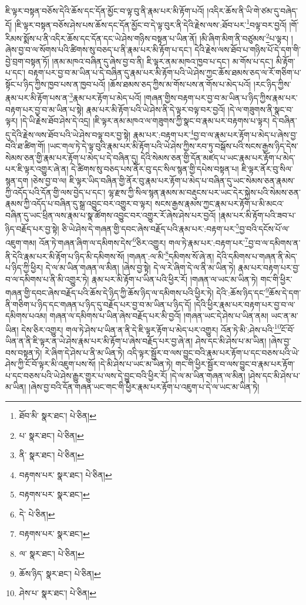 ཇི་ལྟར་བསྟན་བཅོས་དེའི་ཆོས་དང་དོན་མྱོང་བ་ལྟ་བུ་ནི་རྣམ་པར་མི་རྟོག་པའོ། །འདིར་ཆོས་ནི་ཡི་གེ་ཙམ་དུ་བཞེད་དོ། །ཇི་ལྟར་བསྟན་བཅོས་ཤེས་པས་ཆོས་དང་དོན་མྱོང་བ་དེ་ལྟ་བུར་ནི་དེའི་རྗེས་ལས་:ཐོབ་པར་\footnote{ཐོབ་མི་  སྣར་ཐང་།  པེ་ཅིན། }བལྟ་བར་བྱའོ། །གོ་རིམས་སྨོས་པ་ནི་འདིར་ཆོས་དང་དོན་དང་ཡེ་ཤེས་གཉིས་བསྟན་པ་ཡིན་ནོ། །མི་ཞིག་མིག་ནི་བཙུམས་\footnote{པ་  སྣར་ཐང་།  པེ་ཅིན། }པ་ལྟར། །ཞེས་བྱ་བ་ལ་སོགས་པའི་ཚིགས་སུ་བཅད་པ་ནི་རྣམ་པར་མི་རྟོག་པ་དང་། དེའི་རྗེས་ལས་ཐོབ་པ་གཉིས་པོ་དེ་དག་གི་བྱེ་བྲག་བསྟན་ཏོ། །ནམ་མཁའ་བཞིན་དུ་ཞེས་བྱ་བ་ནི། ཇི་ལྟར་ནམ་མཁའ་ཁྱབ་པ་དང་། མ་གོས་པ་དང་། མི་རྟོག་པ་དང་། བརྟག་པར་བྱ་བ་མ་ཡིན་པ་དེ་བཞིན་དུ་རྣམ་པར་མི་རྟོག་པའི་ཡེ་ཤེས་ཀྱང་ཆོས་ཐམས་ཅད་ལ་རོ་གཅིག་པ་སྟོང་པ་ཉིད་ཀྱིས་ཁྱབ་པས་ན་ཁྱབ་པའོ། །ཆོས་ཐམས་ཅད་ཀྱིས་མ་གོས་པས་ན་གོས་པ་མེད་པའོ། །རང་ཉིད་ཀྱིས་རྣམ་པར་མི་རྟོག་པས་ན་\footnote{ནི་  སྣར་ཐང་།  པེ་ཅིན། }རྣམ་པར་རྟོག་པ་མེད་པའོ། །གཞན་གྱིས་བརྟག་པར་བྱ་བ་མ་ཡིན་པ་ཉིད་ཀྱིས་རྣམ་པར་བརྟག་པར་བྱ་བ་མ་ཡིན་པ་སྟེ། རྣམ་པར་མི་རྟོག་པའི་ཡེ་ཤེས་ནི་དེ་ལྟར་བལྟ་བར་བྱའོ། །དེ་ལ་གཟུགས་ནི་སྣང་བ་ལྟར། །དེ་ཡི་རྗེས་ཐོབ་ཤེས་དེ་འདྲ། །ཇི་ལྟར་ནམ་མཁའ་ལ་གཟུགས་ཀྱི་སྣང་བ་རྣམ་པར་བརྟགས་པ་ལྟར། དེ་བཞིན་དུ་དེའི་རྗེས་ལས་ཐོབ་པའི་ཡེ་ཤེས་བལྟ་བར་བྱ་སྟེ། རྣམ་པར་:བརྟག་པར་\footnote{བརྟགས་པར་  སྣར་ཐང་།  པེ་ཅིན། }བྱ་བ་ལ་རྣམ་པར་རྟོག་པ་མེད་པ་ཞེས་བྱ་བའི་ཐ་ཚིག་གོ། །ཡང་གལ་ཏེ་དེ་ལྟ་བུའི་རྣམ་པར་མི་རྟོག་པའི་ཡེ་ཤེས་ཀྱིས་རབ་ཏུ་བསྒོས་པའི་སངས་རྒྱས་ཉིད་དེས་སེམས་ཅན་གྱི་རྣམ་པར་རྟོག་པ་མེད་པ་དེ་བཞིན་དུ། དེའི་སེམས་ཅན་གྱི་དོན་མཛད་པ་ཡང་རྣམ་པར་རྟོག་པ་མེད་པར་ཇི་ལྟར་འགྱུར་ཞེ་ན། དེ་ཚིགས་སུ་བཅད་པས་ནོར་བུ་དང་སིལ་སྙན་གྱི་དཔེས་བསྟན་པ། ཇི་ལྟར་ནོར་བུ་སིལ་སྙན་དག །ཅེས་བྱ་བ་ལ། ཇི་ལྟར་ཡིད་བཞིན་གྱི་ནོར་བུ་རྣམ་པར་རྟོག་པ་མེད་པ་བཞིན་དུ་ཡང་སེམས་ཅན་རྣམས་ཀྱི་འདོད་པའི་དོན་གྱི་ལས་བྱེད་པ་དང་། ལྷ་རྫས་ཀྱི་སིལ་སྙན་རྣམས་མ་བརྡུངས་པར་ཡང་དེར་སྐྱེས་པའི་སེམས་ཅན་རྣམས་ཀྱི་འདོད་པ་བཞིན་དུ་སྒྲ་འབྱུང་བར་འགྱུར་བ་ལྟར། སངས་རྒྱས་རྣམས་ཀྱང་རྣམ་པར་རྟོག་པ་མི་མངའ་བཞིན་དུ་ཡང་ཕྲིན་ལས་རྣམ་པ་སྣ་ཚོགས་འབྱུང་བར་འགྱུར་རོ་ཞེས་ཤེས་པར་བྱའོ། །རྣམ་པར་མི་རྟོག་པའི་ཟབ་པ་ཉིད་བརྗོད་པར་བྱ་སྟེ། ཅི་ཡེ་ཤེས་དེ་གཞན་གྱི་དབང་ཞེས་བརྗོད་པའི་རྣམ་པར་:བརྟག་པར་\footnote{བརྟགས་པར་  སྣར་ཐང་། }བྱ་བའི་དངོས་པོ་ལ་འཇུག་གམ། འོན་ཏེ་གཞན་ཞིག་ལ་དམིགས་དེས་\footnote{དེ་  པེ་ཅིན། }ཅིར་འགྱུར། གལ་ཏེ་རྣམ་པར་:བརྟག་པར་\footnote{བརྟགས་པར་  སྣར་ཐང་། }བྱ་བ་ལ་དམིགས་ན་ནི་དེའི་རྣམ་པར་མི་རྟོག་པ་ཉིད་མི་དམིགས་སོ། །གཞན་:ལ་མི་\footnote{ལ་  སྣར་ཐང་།  པེ་ཅིན། }དམིགས་སོ་ཞེ་ན། དེའི་དམིགས་པ་གཞན་ནི་མེད་པ་ཉིད་ཀྱི་ཕྱིར། དེ་ལ་མ་ཡིན་གཞན་ལ་མིན། །ཞེས་བྱ་སྟེ། དེ་ལ་རེ་ཞིག་དེ་ལ་ནི་མ་ཡིན་ཏེ། རྣམ་པར་བརྟག་པར་བྱ་བ་ལ་དམིགས་པ་ནི་མི་འགྱུར་ཏེ། རྣམ་པར་མི་རྟོག་པ་ཡིན་པའི་ཕྱིར་རོ། །གཞན་ལ་ཡང་མ་ཡིན་ཏེ། གང་གི་ཕྱིར་གཞན་གྱི་དབང་ཞེས་བརྗོད་པའི་ཆོས་དེ་ཉིད་ཀྱི་ཆོས་ཉིད་ལ་དམིགས་པའི་ཕྱིར་ཏེ། དེའི་:ཆོས་ཉིད་དང་\footnote{ཆོས་ཉིད་  སྣར་ཐང་།  པེ་ཅིན། }ཆོས་དེ་དག་ནི་གཅིག་པ་ཉིད་དང་གཞན་པ་ཉིད་དུ་བརྗོད་པར་བྱ་བ་མ་ཡིན་པ་ཉིད་དོ། །དེའི་ཕྱིར་རྣམ་པར་བརྟག་པར་བྱ་བ་ལ་དམིགས་པའམ། གཞན་ལ་དམིགས་པ་ཡིན་ཞེས་བརྗོད་པར་མི་བྱའོ། །གཞན་ཡང་དེ་ཤེས་པ་ཡིན་ནམ། ཡང་ན་མ་ཡིན། དེས་ཅིར་འགྱུར། གལ་ཏེ་ཤེས་པ་ཡིན་ན་ནི་དེ་ཇི་ལྟར་རྟོག་པ་མེད་པར་འགྱུར། འོན་ཏེ་མི་:ཤེས་པའི་\footnote{ཤེས་པ་  སྣར་ཐང་།  པེ་ཅིན། }ངོ་བོ་ཡིན་ན་ནི་ཇི་ལྟར་ན་ཡེ་ཤེས་རྣམ་པར་མི་རྟོག་པ་ཞེས་བརྗོད་པར་བྱ་ཞེ་ན། ཤེས་དང་མི་ཤེས་པ་མ་ཡིན། །ཞེས་བྱ་བས་བསྟན་ཏེ། རེ་ཞིག་དེ་ཤེས་པ་ནི་མ་ཡིན་ཏེ། འདི་ལྟར་སྦྱོར་བ་ལས་བྱུང་བའི་རྣམ་པར་རྟོག་པ་དང་བཅས་པའི་ཡེ་ཤེས་ཀྱི་ངོ་བོ་ལྟར་མི་འཇུག་པས་སོ། །དེ་མི་ཤེས་པ་ཡང་མ་ཡིན་ཏེ། གང་གི་ཕྱིར་སྦྱོར་བ་ལས་བྱུང་བ་རྣམ་པར་རྟོག་པ་དང་བཅས་པའི་ཡེ་ཤེས་རྒྱུར་གྱུར་པ་ལས་དེ་བྱུང་བའི་ཕྱིར་རོ། །དེ་ལ་མ་ཡིན་གཞན་ལ་མིན། །ཤེས་དང་མི་ཤེས་པ་མ་ཡིན། །ཞེས་བྱ་བའི་དོན་གཞན་ཡང་གང་གི་ཕྱིར་རྣམ་པར་རྟོག་པ་འཇུག་པ་དེ་ལ་ཡང་མ་ཡིན་ཏེ། 